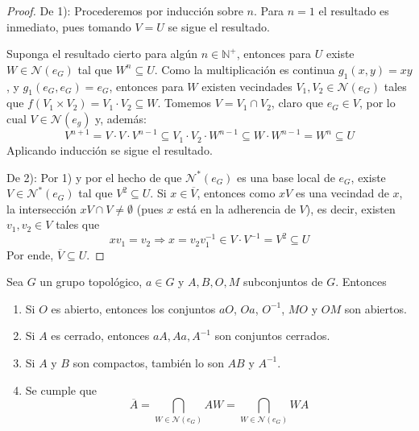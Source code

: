 \documentclass[12pt]{report}
\theoremstyle{largebreak}
\newcommand{\N}[1]{\ensuremath{\mathscr{N}(#1)}}
\newcommand{\Ns}[1]{\ensuremath{\mathscr{N}^*(#1)}}
\begin{document}
    \begin{proof}
        De 1): Procederemos por inducción sobre $n$. Para $n=1$ el resultado es inmediato, pues tomando $V=U$ se sigue el resultado.

        Suponga el resultado cierto para algún $n\in\mathbb{N}^+$, entonces para $U$ existe $W\in\N{e_G}$ tal que $W^n\subseteq U$. Como la multiplicación es continua $g_1(x,y)=xy$, y $g_1(e_G,e_G)=e_G$, entonces para $W$ existen vecindades $V_1,V_2\in\N{e_G}$ tales que $f(V_1\times V_2)=V_1\cdot V_2\subseteq W$. Tomemos $V=V_1\cap V_2$, claro que $e_G\in V$, por lo cual $V\in\N{e_g}$ y, además:
        \begin{equation*}
            V^{n+1}= V\cdot V\cdot V^{n-1}\subseteq V_1\cdot V_2\cdot W^{n-1}\subseteq W\cdot W^{n-1}=W^n\subseteq U
        \end{equation*}
        Aplicando inducción se sigue el resultado.

        De 2): Por 1) y por el hecho de que $\Ns{e_G}$ es una base local de $e_G$, existe $V\in\Ns{e_G}$ tal que $V^2\subseteq U$. Si $x\in\overline{V}$, entonces como $xV$ es una vecindad de $x$, la intersección $xV\cap V\neq\emptyset$ (pues $x$ está en la adherencia de $V$), es decir, existen $v_1,v_2\in V$ tales que
        \begin{equation*}
            xv_1=v_2\Rightarrow x=v_2v_1^{-1}\in V\cdot V^{-1}=V^{2}\subseteq U
        \end{equation*}
        Por ende, $\overline{V}\subseteq U$.
    \end{proof}

    \begin{theor}
        Sea $G$ un grupo topológico, $a\in G$ y $A, B, O, M$ subconjuntos de $G$. Entonces
        \begin{enumerate}
            \item Si $O$ es abierto, entonces los conjuntos $aO$, $Oa$, $O^{-1}$, $MO$ y $OM$ son abiertos.
            \item Si $A$ es cerrado, entonces $aA, Aa, A^{-1}$ son conjuntos cerrados.
            \item Si $A$ y $B$ son compactos, también lo son $AB$ y $A^{-1}$.
            \item Se cumple que
            \begin{equation*}
                \overline{A}=\bigcap_{W\in\N{e_G}}AW=\bigcap_{W\in\N{e_G}}WA
            \end{equation*}
        \end{enumerate}
    \end{theor}
\end{document}
